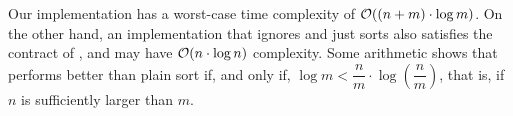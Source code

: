 
\FloatBarrier


Our implementation has a worst-case time complexity of
${\cal O}((n+m) \cdot \log m)$.
%
On the other hand, an implementation that ignores  and just sorts 
also satisfies the contract of ,
and may have ${\cal O}(n \cdot \log n)$ complexity.
%
Some arithmetic shows that \partialsort performs better than
plain sort if, and only if,
$\log m < \dfrac{n}{m} \cdot \log\left(\dfrac{n}{m}\right)$,
that is, if $n$ is sufficiently larger than $m$.



\clearpage

